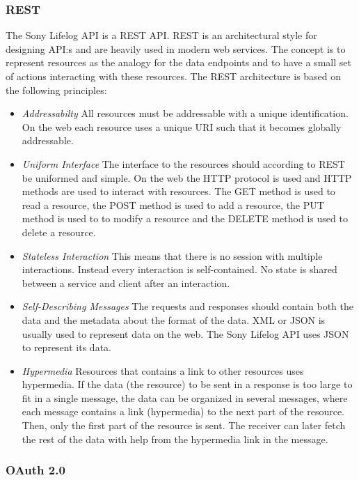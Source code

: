 \documentclass{cslthse-msc}
\begin{document}
\subsubsection{REST}
\label{sec:rest}

The Sony Lifelog API is a REST API. REST is an architectural style for designing API:s and are heavily used in modern web services. The concept is to represent resources as the analogy for the data endpoints and to have a small set of actions interacting with these resources. The REST architecture is based on the following principles\cite{pautasso2014restful}:

\begin{itemize}
    \item \emph{Addressabilty} All resources must be addressable with a unique identification. On the web each resource uses a unique URI such that it becomes globally addressable.
    \item \emph{Uniform Interface} The interface to the resources should according to REST be uniformed and simple. On the web the HTTP protocol is used and HTTP methods are used to interact with resources. The GET method is used to read a resource, the POST method is used to add a resource, the PUT method is used to to modify a resource and the DELETE method is used to delete a resource.
    \item \emph{Stateless Interaction} This means that there is no session with multiple interactions. Instead every interaction is self-contained. No state is shared between a service and client after an interaction.
    \item \emph{Self-Describing Messages} The requests and responses should contain both the data and the metadata about the format of the data. XML or JSON is usually used to represent data on the web. The Sony Lifelog API uses JSON to represent its data.
\item \emph{Hypermedia} Resources that contains a link to other resources uses hypermedia. If the data (the resource) to be sent in a response is too large to fit in a single message, the data can be organized in several messages, where each message contains a link (hypermedia) to the next part of the resource. Then, only the first part of the resource is sent. The receiver can later fetch the rest of the data with help from the hypermedia link in the message.

\end{itemize}

\subsubsection{OAuth 2.0}
\end{document}
